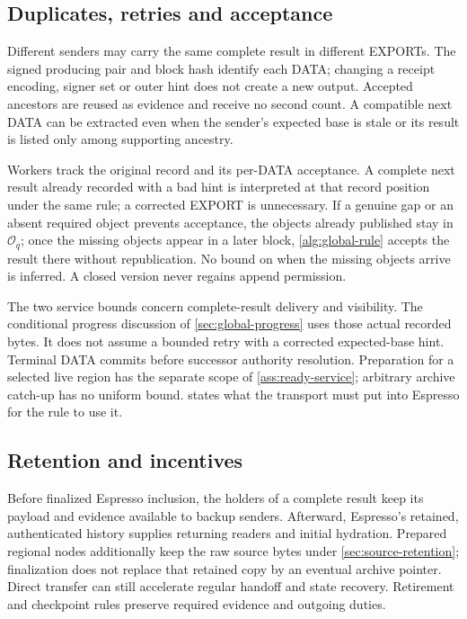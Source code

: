 \documentclass[11pt,a4paper]{article}
\begin{document}
\subsection{Duplicates, retries and acceptance}
Different senders may carry the same complete result in different EXPORTs.
The signed producing pair and block hash identify each DATA; changing a
receipt encoding, signer set or outer hint does not create a new output.
Accepted ancestors are reused as evidence and receive no second count.
A compatible next DATA can be extracted even when the sender's expected
base is stale or its result is listed only among supporting ancestry.

Workers track the original record and its per-DATA acceptance. A complete
next result already recorded with a bad hint is interpreted at that
record position under the same rule; a corrected EXPORT is unnecessary.
If a genuine gap or an absent required object prevents acceptance, the
objects already published stay in $\mathcal O_q$; once the missing
objects appear in a later block, \cref{alg:global-rule} accepts the
result there without republication. No bound on when the missing
objects arrive is inferred. A closed version never regains append
permission.

The two service bounds concern complete-result delivery and visibility.
The conditional progress discussion of \cref{sec:global-progress}
uses those actual recorded bytes. It does not assume a bounded retry
with a corrected expected-base hint. Terminal DATA commits before successor authority
resolution. Preparation for a selected live region has the separate
scope of \cref{ass:ready-service}; arbitrary archive catch-up has no
uniform bound.  states what the transport
must put into Espresso for the rule to use it.

\subsection{Retention and incentives}
Before finalized Espresso inclusion, the holders of a complete result
keep its payload and evidence available to backup senders. Afterward,
Espresso's retained, authenticated history supplies returning readers and
initial hydration. Prepared regional nodes additionally keep the raw
source bytes under \cref{sec:source-retention}; finalization does not
replace that retained copy by an eventual archive pointer. Direct transfer
can still accelerate regular handoff and state recovery. Retirement and
checkpoint rules preserve required evidence and outgoing duties.
\end{document}
